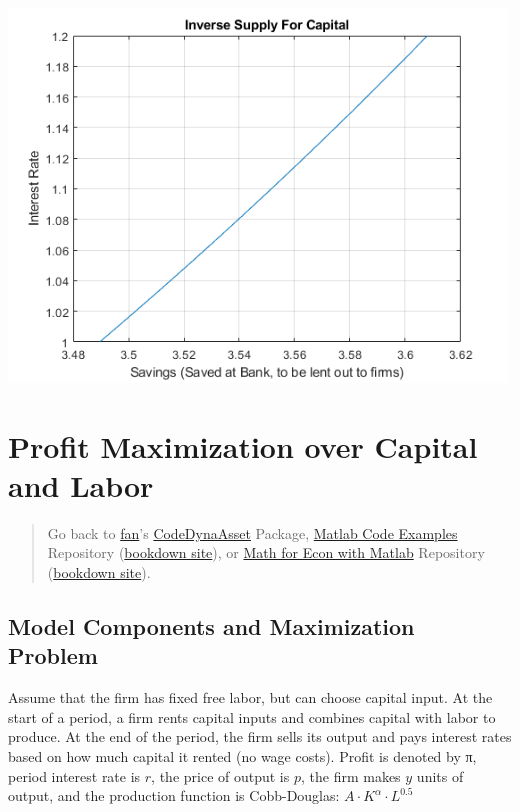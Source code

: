 \documentclass[
]{book}
\begin{document}
\includegraphics[width=5.20833in,height=\textheight]{img/K_save_households_images/figure_1.png}

\hypertarget{profit-maximization-over-capital-and-labor}{%
\section{Profit Maximization over Capital and Labor}\label{profit-maximization-over-capital-and-labor}}

\begin{quote}
Go back to \href{http://fanwangecon.github.io/}{fan}'s \href{https://fanwangecon.github.io/CodeDynaAsset/}{CodeDynaAsset} Package, \href{https://fanwangecon.github.io/M4Econ/}{Matlab Code Examples} Repository (\href{https://fanwangecon.github.io/M4Econ/bookdown}{bookdown site}), or \href{https://fanwangecon.github.io/Math4Econ/}{Math for Econ with Matlab} Repository (\href{https://fanwangecon.github.io/Math4Econ/bookdown}{bookdown site}).
\end{quote}

\hypertarget{model-components-and-maximization-problem-1}{%
\subsection{Model Components and Maximization Problem}\label{model-components-and-maximization-problem-1}}

Assume that the firm has fixed free labor, but can choose capital input.
At the start of a period, a firm rents capital inputs and combines
capital with labor to produce. At the end of the period, the firm sells
its output and pays interest rates based on how much capital it rented
(no wage costs). Profit is denoted by π, period interest rate is \(r\),
the price of output is \(p\), the firm makes \(y\) units of output, and the
production function is Cobb-Douglas: \(A\cdot K^{\alpha } \cdot L^{0.5}\)
\end{document}
